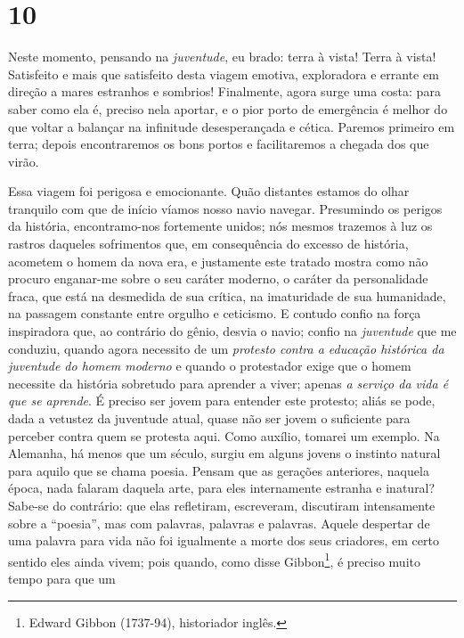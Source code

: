 \chapter{10}\label{capuxedtulo-10}

Neste momento, pensando na \emph{juventude}, eu brado: terra à
    vista! Terra à vista! Satisfeito e mais que satisfeito desta viagem
    emotiva, exploradora e errante em direção a mares estranhos e
    sombrios! Finalmente, agora surge uma costa: para saber como ela é,
    preciso nela aportar, e o pior porto de emergência é melhor do que
    voltar a balançar na infinitude desesperançada e cética. Paremos
    primeiro em terra; depois encontraremos os bons portos e
    facilitaremos a chegada dos que virão.

    Essa viagem foi perigosa e emocionante. Quão distantes estamos do
    olhar tranquilo com que de início víamos nosso navio navegar.
    Presumindo os perigos da história, encontramo-nos fortemente unidos;
    nós mesmos trazemos à luz os rastros daqueles sofrimentos que, em
    consequência do excesso de história, acometem o homem da nova era, e
    justamente este tratado mostra como não procuro enganar-me sobre o
    seu caráter moderno, o caráter da personalidade fraca, que está na
    desmedida de sua crítica, na imaturidade de sua humanidade, na
    passagem constante entre orgulho e ceticismo. E contudo confio na
    força inspiradora que, ao contrário do gênio, desvia o navio; confio
    na \emph{juventude} que me conduziu, quando agora necessito de um
    \emph{protesto contra a educação histórica da juventude do homem
    moderno} e quando o protestador exige que o homem necessite da
    história sobretudo para aprender a viver; apenas \emph{a serviço da
    vida é que se aprende}. É preciso ser jovem para entender este
    protesto; aliás se pode, dada a vetustez da juventude atual, quase
    não ser jovem o suficiente para perceber contra quem se protesta
    aqui. Como auxílio, tomarei um exemplo. Na Alemanha, há menos que um
    século, surgiu em alguns jovens o instinto natural para aquilo que se
    chama poesia. Pensam que as gerações anteriores, naquela época, nada
    falaram daquela arte, para eles internamente estranha e inatural?
    Sabe-se do contrário: que elas refletiram, escreveram, discutiram
    intensamente sobre a ``poesia'', mas com palavras, palavras e
    palavras. Aquele despertar de uma palavra para vida não foi
    igualmente a morte dos seus criadores, em certo sentido eles ainda
    vivem; pois quando, como disse Gibbon\footnote{Edward Gibbon
      (1737-94), historiador inglês.}, é preciso muito tempo para que um
